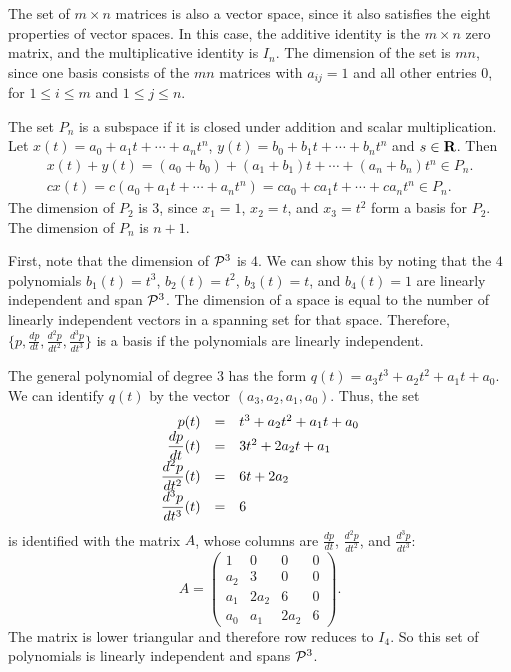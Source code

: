 \documentclass{ximera}
\begin{document}
\para The set of $m \times n$ matrices is also a vector space, since
it also satisfies the eight properties of vector spaces.  In this
case, the additive identity is the $m \times n$ zero matrix, and
the multiplicative identity is $I_n$.  The dimension of the set is
$mn$, since one basis consists of the $mn$ matrices with $a_{ij}
= 1$ and all other entries $0$, for $1 \leq i \leq m$ and $1 \leq j
\leq n$.

The set $P_n$ is a subspace if it is closed under addition and
scalar multiplication.  Let $x(t) = a_0 + a_1t + \cdots +
a_nt^n$, $y(t) = b_0 + b_1t + \cdots + b_nt^n$ and $s \in \mbox{$\bf{R}$}$.
Then
\[
\begin{array}{l}
x(t) + y(t) = (a_0 + b_0) + (a_1 + b_1)t + \cdots + (a_n + b_n)t^n \in P_n.
\\
cx(t) = c(a_0 + a_1t + \cdots + a_nt^n) = ca_0 + ca_1t + \cdots + ca_nt^n
\in P_n.
\end{array}
\]
The dimension of $P_2$ is 3, since $x_1 = 1$, $x_2 = t$, and
$x_3 = t^2$ form a basis for $P_2$.  The dimension of $P_n$ is
$n + 1$.

First, note that the dimension of ${\cal P}^3$ is $4$.  We can show
this by noting that the $4$ polynomials $b_1(t) = t^3$, $b_2(t) =
t^2$, $b_3(t) = t$, and $b_4(t) = 1$ are linearly independent and
span ${\cal P}^3$.  The dimension of a space is equal to the number of
linearly independent vectors in a spanning set for that space.
Therefore, $\{p, \frac{dp}{dt}, \frac{d^2p}{dt^2}, \frac{d^3p}{dt^3}\}$
is a basis if the polynomials are linearly independent.

\para The general polynomial of degree $3$ has the form $q(t) =
a_3t^3 + a_2t^2 + a_1t + a_0$.  We can identify $q(t)$ by the vector 
$(a_3,a_2,a_1,a_0)$.  Thus, the set
\[
\begin{array}{rcl}
\displaystyle p(t) & = & t^3 + a_2t^2 + a_1t + a_0 \\
\displaystyle \frac{dp}{dt}(t) & = & 3t^2 + 2a_2t + a_1 \\
\displaystyle \frac{d^2p}{dt^2}(t) & = & 6t + 2a_2 \\
\displaystyle \frac{d^3p}{dt^3}(t) & = & 6 \end{array}
\]
is identified with the matrix $A$, whose columns are 
$\frac{dp}{dt}$, $\frac{d^2p}{dt^2}$, and $\frac{d^3p}{dt^3}$:
\[ A = \left(\begin{array}{cccc} 1 & 0 & 0 & 0 \\
a_2 & 3 & 0 & 0 \\ a_1 & 2a_2 & 6 & 0 \\ a_0 & a_1 & 2a_2 & 6
\end{array}\right). \]
The matrix is lower triangular and therefore row reduces to $I_4$.  So
this set of polynomials is linearly independent and spans ${\cal P}^3$.
\end{document}

